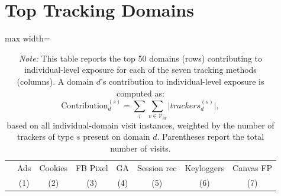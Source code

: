 \documentclass[12pt, letterpaper]{article}
\begin{document}
\section{Top Tracking Domains}
\label{sm:top_tracking_domains}
\begin{table}[ht]
\centering
\setlength\tabcolsep{2 pt}
\setlength{\defaultaddspace}{0pt}
\def\sym#1{\ifmmode^{#1}\else\(^{#1}\)\fi}
\caption{Top domains contributing to exposure}
\label{tab:bl_top_contributors_domain}
\begingroup
\centering
\begin{adjustbox}{max width=\textwidth}
\begin{tabular}{@{\hspace{0\tabcolsep}}llllllll@{\hspace{0\tabcolsep}}}
      \toprule
      &\multicolumn{1}{c}{Ads}&\multicolumn{1}{c}{Cookies}&\multicolumn{1}{c}{FB Pixel}&\multicolumn{1}{c}{GA}&\multicolumn{1}{c}{Session rec}&\multicolumn{1}{c}{Keyloggers}&\multicolumn{1}{c}{Canvas FP}\\
      &\multicolumn{1}{c}{(1)}&\multicolumn{1}{c}{(2)}&\multicolumn{1}{c}{(3)}&\multicolumn{1}{c}{(4)}&\multicolumn{1}{c}{(5)}&\multicolumn{1}{c}{(6)}&\multicolumn{1}{c}{(7)}\\
      \midrule
      
      \bottomrule
   \end{tabular}
\end{adjustbox}
\par\endgroup
\caption*{
    \footnotesize \textit{Note:}
    This table reports the top 50 domains (rows) contributing to individual-level exposure for each of the seven tracking methods (columns).
    A domain $d$'s contribution to individual-level exposure is computed as:
    \begin{equation*}
    \text{Contribution}_d^{(s)} = 
    \sum_{i} \sum_{v \in \mathcal{V}_{id}} 
    \vert trackers^{(s)}_d \vert,
    \end{equation*}
    based on all individual-domain visit instances, weighted by the number of trackers of type $s$ present on domain $d$.
    Parentheses report the total number of visits.
}
\end{table}
\end{document}
